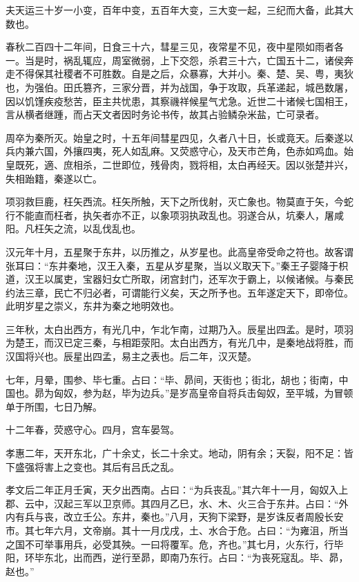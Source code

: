 \documentclass[12pt,UTF8]{ctexbook}
\begin{document}
夫天运三十岁一小变，百年中变，五百年大变，三大变一起，三纪而大备，此其大数也。



春秋二百四十二年间，日食三十六，彗星三见，夜常星不见，夜中星陨如雨者各一。当是时，祸乱辄应，周室微弱，上下交怨，杀君三十六，亡国五十二，诸侯奔走不得保其社稷者不可胜数。自是之后，众暴寡，大并小。秦、楚、吴、粤，夷狄也，为强伯。田氏篡齐，三家分晋，并为战国，争于攻取，兵革递起，城邑数屠，因以饥馑疾疫愁苦，臣主共忧患，其察禨祥候星气尤急。近世二十诸候七国相王，言从横者继踵，而占天文者因时务论书传，故其占验鳞杂米盐，亡可录者。



周卒为秦所灭。始皇之时，十五年间彗星四见，久者八十日，长或竟天。后秦遂以兵内兼六国，外攘四夷，死人如乱麻。又荧惑守心，及天市芒角，色赤如鸡血。始皇既死，適、庶相杀，二世即位，残骨肉，戮将相，太白再经天。因以张楚并兴，失相跆籍，秦遂以亡。



项羽救巨鹿，枉矢西流。枉矢所触，天下之所伐射，灭亡象也。物莫直于矢，今蛇行不能直而枉者，执矢者亦不正，以象项羽执政乱也。羽遂合从，坑秦人，屠咸阳。凡枉矢之流，以乱伐乱也。



汉元年十月，五星聚于东井，以历推之，从岁星也。此高皇帝受命之符也。故客谓张耳曰：“东井秦地，汉王入秦，五星从岁星聚，当以义取天下。”秦王子婴降于枳道，汉王以属吏，宝器妇女亡所取，闭宫封门，还军次于霸上，以候诸候。与秦民约法三章，民亡不归必者，可谓能行义矣，天之所予也。五年遂定天下，即帝位。此明岁星之崇义，东井为秦之地明效也。



三年秋，太白出西方，有光几中，乍北乍南，过期乃入。辰星出四孟。是时，项羽为楚王，而汉已定三秦，与相距荥阳。太白出西方，有光几中，是秦地战将胜，而汉国将兴也。辰星出四孟，易主之表也。后二年，汉灭楚。



七年，月晕，围参、毕七重。占曰：“毕、昴间，天街也；街北，胡也；街南，中国也。昴为匈奴，参为赵，毕为边兵。”是岁高皇帝自将兵击匈奴，至平城，为冒顿单于所围，七日乃解。



十二年春，荧惑守心。四月，宫车晏驾。



孝惠二年，天开东北，广十余丈，长二十余丈。地动，阴有余；天裂，阳不足：皆下盛强将害上之变也。其后有吕氏之乱。



孝文后二年正月壬寅，天夕出西南。占曰：“为兵丧乱。”其六年十一月，匈奴入上郡、云中，汉起三军以卫京师。其四月乙巳，水、木、火三合于东井。占曰：“外内有兵与丧，改立壬公。东井，秦也。”八月，天狗下梁野，是岁诛反者周殷长安市。其七年六月，文帝崩。其十一月戊戌，土、水合于危。占曰：“为雍沮，所当之国不可举事用兵，必受其殃。一曰将覆军。危，齐也。”其七月，火东行，行毕阳，环毕东北，出而西，逆行至昴，即南乃东行。占曰：“为丧死寇乱。毕、昴，赵也。”
\end{document}
